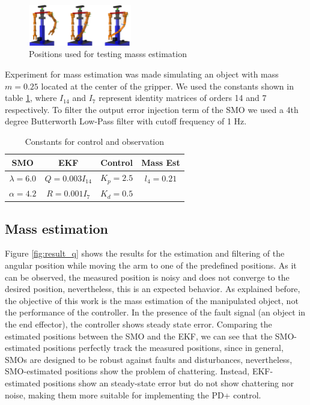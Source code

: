 \documentclass[conference,letterpaper]{ieeeconf}
\begin{document}
\begin{figure}
  \centering
  \includegraphics[width=0.4\textwidth]{Figures/test_poses.png}
  \caption{Positions used for testing masss estimation}
  \label{fig:test_poses}
\end{figure}

Experiment for mass estimation was made simulating an object with mass $m=0.25$ located at the center of the gripper. We used the constants shown in table \ref{tab:constants}, where $I_{14}$ and $I_7$ represent identity matrices of orders 14 and 7 respectively. To filter the output error injection term of the SMO we used a 4th degree Butterworth Low-Pass filter with cutoff frequency of 1 Hz. 
\begin{table}
  \centering
  \begin{tabular}{|c|c|c|c|}
    \hline
    SMO & EKF & Control & Mass Est\\
    \hline
    $\lambda=6.0$ & $Q = 0.003I_{14}$ & $K_p= 2.5$ & $l_4 = 0.21$\\
    $\alpha=4.2$ & $R = 0.001I_7$ & $K_d = 0.5$  & \\
    \hline
  \end{tabular}
  \caption{Constants for control and observation}
  \label{tab:constants}
\end{table}

\subsection{Mass estimation}
Figure \ref{fig:result_q} shows the results for the estimation and filtering of the angular position while moving the arm to one of the predefined positions. As it can be observed, the measured position is noisy and does not converge to the desired position, nevertheless, this is an expected behavior. As explained before, the objective of this work is the mass estimation of the manipulated object, not the performance of the controller. In the presence of the fault signal (an object in the end effector), the controller shows steady state error. Comparing the estimated positions between the SMO and the EKF, we can see that the SMO-estimated positions perfectly track the measured positions, since in general, SMOs are designed to be robust against faults and disturbances, nevertheless, SMO-estimated positions show the problem of chattering. Instead, EKF-estimated positions show an steady-state error but do not show chattering nor noise, making them more suitable for implementing the PD+ control. 
\end{document}
